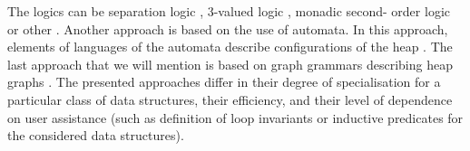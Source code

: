  The logics can be separation logic \cite{John:SL, Stephen:SL,JoshCris:SL,Hongseok:SL,Kamil:SL,Chin:SL,Quang:SL, Ruzica:SL, Constrantin:SL}, 3-valued logic \cite{SagivRW02}, monadic second- order logic \cite{Ander:ML, Jakob:ML,Madhusudan:ML} or other \cite{Shmuel:Shape, Karen:Shape}. Another approach is based on the use of automata. In this approach, elements of languages of the automata describe configurations of the heap \cite{Ahmed:TreeAutomata, Ahmed:TreeAutomata2}. The last approach that we will mention is based on graph grammars describing heap graphs \cite{Jonathan:Shape, Jonathan:Grammars}. The presented approaches differ in their degree of specialisation for a particular class of data structures, their efficiency, and their level of dependence on user assistance (such as definition of loop invariants or inductive predicates for the considered data structures).
%
